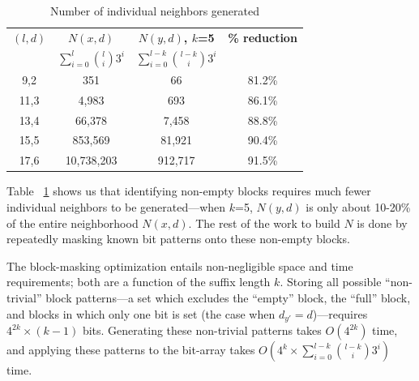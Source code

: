 \documentclass{acm_proc_article-sp}
\begin{document}
			\begin{table}[h] %
				\small
				\renewcommand{\arraystretch}{1.3}
				\caption{\small Number of individual neighbors generated}
				\label{tbl:neighbors_blockmasking}
				\centering
				\begin{tabular}{|c|c|c|c|}
				\hline 
				\bfseries\boldmath $(l,d)$ & \bfseries\boldmath $N(x,d)$ & \bfseries\boldmath $N(y,d)$, $k$=5 & \bfseries \% reduction\\
				\bfseries & \bfseries\boldmath $\sum_{i=0}^{l} \binom{l}{i} 3^{i}$ & \bfseries\boldmath $\sum_{i=0}^{l-k} \binom{l-k}{i} 3^{i}$ & \\
				\hline
				 9,2 &         351  &       66 & 81.2\%\\
				11,3 &       4,983  &      693 & 86.1\%\\
				13,4 &      66,378  &    7,458 & 88.8\%\\
				15,5 &     853,569  &   81,921 & 90.4\%\\
				17,6 &  10,738,203  &  912,717 & 91.5\%\\
				\hline\end{tabular}
				\end{table}

			Table ~\ref{tbl:neighbors_blockmasking} shows us that identifying non-empty blocks requires much fewer individual neighbors to be generated---when $k$=5, $N(y,d)$ is only about 10-20\% of the entire neighborhood $N(x,d)$. The rest of the work to build $N$ is done by repeatedly masking known bit patterns onto these non-empty blocks.

			The block-masking optimization entails non-negligible space and time requirements; both are a function of the suffix length $k$. Storing all possible ``non-trivial'' block patterns---a set which excludes the ``empty'' block, the ``full'' block, and blocks in which only one bit is set (the case when $d_{y'} = d$)---requires $4^{2k}\times (k-1)$ bits. Generating these non-trivial patterns takes $O(4^{2k})$ time, and applying these patterns to the bit-array takes $O(4^{k} \times \sum_{i=0}^{l-k} \binom{l-k}{i} 3^{i})$ time. 
\end{document}

